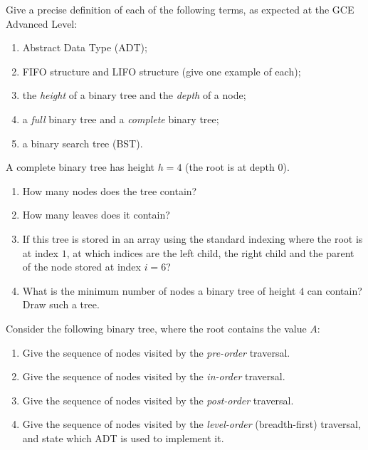 \documentclass[11pt]{article}
\newcounter{popsec}
\newcounter{popsub}
\newcommand{\courssub}[1]{%
  \stepcounter{popsub}%
  \par\vspace{9pt}\noindent{\popxbold\fontsize{11.5}{13}\selectfont\color{popink}{\color{poporange}\thepopsec.\thepopsub}\hspace{6pt}#1}\par\nopagebreak\vspace{4pt}
}
\begin{document}
\begin{exercice}
Give a precise definition of each of the following terms, as expected at the GCE Advanced Level:
\begin{enumerate}
\item Abstract Data Type (ADT);
\item FIFO structure and LIFO structure (give one example of each);
\item the \emph{height} of a binary tree and the \emph{depth} of a node;
\item a \emph{full} binary tree and a \emph{complete} binary tree;
\item a binary search tree (BST).
\end{enumerate}
\end{exercice}

\begin{exercice}
A complete binary tree has height $h = 4$ (the root is at depth $0$).
\begin{enumerate}
\item How many nodes does the tree contain?
\item How many leaves does it contain?
\item If this tree is stored in an array using the standard indexing where the root is at index $1$, at which indices are the left child, the right child and the parent of the node stored at index $i = 6$?
\item What is the minimum number of nodes a binary tree of height $4$ can contain? Draw such a tree.
\end{enumerate}
\end{exercice}

\courssub{I practise}

\begin{exercice}
Consider the following binary tree, where the root contains the value $A$:
\begin{center}
\end{center}
\begin{enumerate}
\item Give the sequence of nodes visited by the \emph{pre-order} traversal.
\item Give the sequence of nodes visited by the \emph{in-order} traversal.
\item Give the sequence of nodes visited by the \emph{post-order} traversal.
\item Give the sequence of nodes visited by the \emph{level-order} (breadth-first) traversal, and state which ADT is used to implement it.
\end{enumerate}
\end{exercice}
\end{document}
